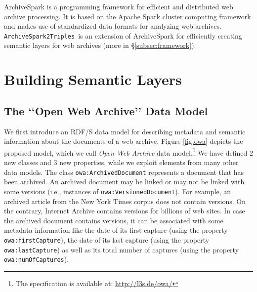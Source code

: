 \documentclass{libtex/sig-alternate-05-2015}
\newcommand{\q}[1]{\lq\lq{}{}#1\rq\rq{}{}}
\newcommand{\tool}[0]{{\tt ArchiveSpark2Triples}}
\begin{document}
ArchiveSpark \cite{holzmann2016archivespark} is a programming framework
for efficient and distributed web archive processing.
It is based on the Apache Spark
cluster computing framework \cite{spark2015apache}
and makes use of standardized data formats
for analyzing web archives.
\tool\ is
an extension of ArchiveSpark for efficiently creating
semantic layers for web archives (more in \S \ref{subsec:framework}).



\section{Building Semantic Layers}
\label{sec:constrSemLayers}

\subsection{The \q{Open Web Archive} Data Model}
\label{subsec:semanticmodel}

We first introduce an RDF/S data model
for describing metadata and semantic information about the documents of a web archive.
Figure \ref{fig:owa} depicts the proposed model,
which we call {\em Open Web Archive} data model.\footnote{The specification
 is available at: \url{http://l3s.de/owa/}}
We have defined 2 new classes and 3 new properties,
while we exploit elements from many other data models.
The class {\tt owa:Archi\-ved\-Do\-cu\-ment} represents a document that has been archived.
An archived document may be linked or may not be linked with some versions
(i.e., instances of {\tt owa:Ve\-rsio\-ned\-Do\-cu\-ment}).
For example, an archi\-ved article from the
New York Times corpus \cite{sandhaus2008new} does not contain versions.
On the contrary,
Internet Archive
contains versions for billions of web sites.
In case the archived document contains versions,
it can be associated with some metadata information
like the date of its first capture (using the property {\tt owa:firstCapture}),
the date of its last capture (using the property {\tt owa:lastCapture}) as well as
its total number of captures (using the property {\tt owa:numOfCaptures}).
\end{document}
